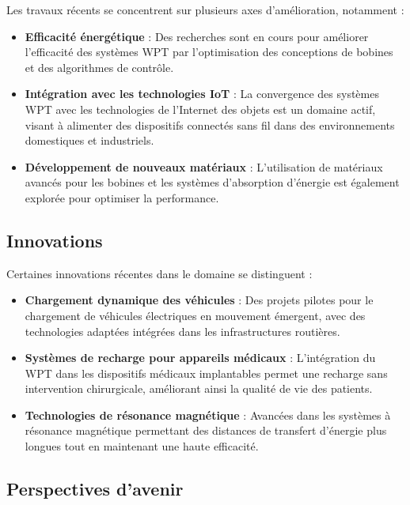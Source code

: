 \documentclass[12pt,a4paper,titlepage,notitlepage]{article}
\begin{document}
	Les travaux récents se concentrent sur plusieurs axes d'amélioration, notamment :
	\begin{itemize}
		\item \textbf{Efficacité énergétique} : Des recherches sont en cours pour améliorer l'efficacité des systèmes WPT par l'optimisation des conceptions de bobines et des algorithmes de contrôle.
		\item \textbf{Intégration avec les technologies IoT} : La convergence des systèmes WPT avec les technologies de l'Internet des objets est un domaine actif, visant à alimenter des dispositifs connectés sans fil dans des environnements domestiques et industriels.
		\item \textbf{Développement de nouveaux matériaux} : L'utilisation de matériaux avancés pour les bobines et les systèmes d'absorption d'énergie est également explorée pour optimiser la performance.
	\end{itemize}
	
	\subsection{Innovations}
	
	Certaines innovations récentes dans le domaine se distinguent :
	\begin{itemize}
		\item \textbf{Chargement dynamique des véhicules} : Des projets pilotes pour le chargement de véhicules électriques en mouvement émergent, avec des technologies adaptées intégrées dans les infrastructures routières.
		\item \textbf{Systèmes de recharge pour appareils médicaux} : L'intégration du WPT dans les dispositifs médicaux implantables permet une recharge sans intervention chirurgicale, améliorant ainsi la qualité de vie des patients.
		\item \textbf{Technologies de résonance magnétique} : Avancées dans les systèmes à résonance magnétique permettant des distances de transfert d'énergie plus longues tout en maintenant une haute efficacité.
	\end{itemize}
	
	\subsection{Perspectives d'avenir}
	
\end{document}
